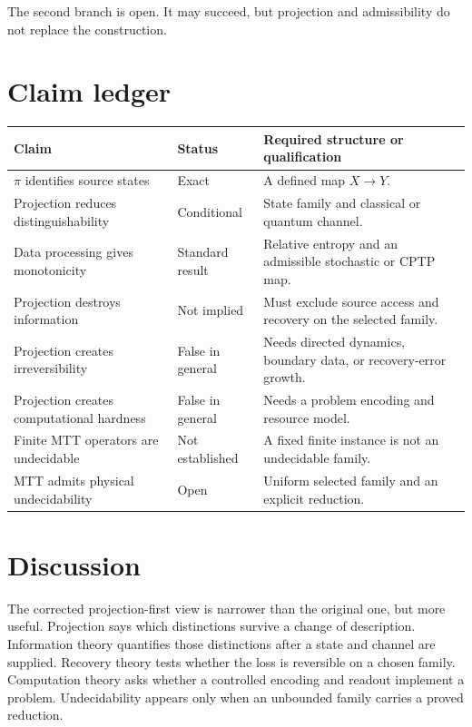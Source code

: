 \documentclass[11pt]{article}
\begin{document}
The second branch is open. It may succeed, but projection and admissibility
do not replace the construction.

\section{Claim ledger}

\begin{center}
\small
\begin{tabularx}{\textwidth}{@{}p{}p{}X@{}}
\toprule
Claim & Status & Required structure or qualification\\
\midrule
\(\pi\) identifies source states & Exact & A defined map \(X\to Y\).\\
Projection reduces distinguishability & Conditional & State family and
classical or quantum channel.\\
Data processing gives monotonicity & Standard result & Relative entropy and
an admissible stochastic or CPTP map.\\
Projection destroys information & Not implied & Must exclude source access
and recovery on the selected family.\\
Projection creates irreversibility & False in general & Needs directed
dynamics, boundary data, or recovery-error growth.\\
Projection creates computational hardness & False in general & Needs a
problem encoding and resource model.\\
Finite MTT operators are undecidable & Not established & A fixed finite
instance is not an undecidable family.\\
MTT admits physical undecidability & Open & Uniform selected family and an
explicit reduction.\\
\bottomrule
\end{tabularx}
\end{center}

\section{Discussion}

The corrected projection-first view is narrower than the original one, but
more useful. Projection says which distinctions survive a change of
description. Information theory quantifies those distinctions after a
state and channel are supplied. Recovery theory tests whether the loss is
reversible on a chosen family. Computation theory asks whether a controlled
encoding and readout implement a problem. Undecidability appears only when
an unbounded family carries a proved reduction.
\end{document}
